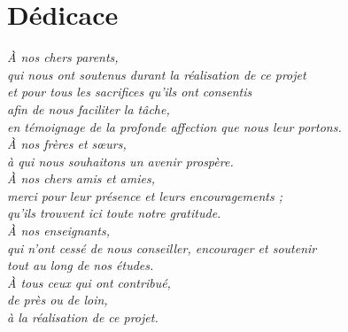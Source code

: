 
\chapter*{Dédicace}

\vspace*{2cm}

\begin{center}
{\large\itshape
À nos chers parents,\\
qui nous ont soutenus durant la réalisation de ce projet\\
et pour tous les sacrifices qu'ils ont consentis\\
afin de nous faciliter la tâche,\\
en témoignage de la profonde affection que nous leur portons.\\[1.2em]

À nos frères et sœurs,\\
à qui nous souhaitons un avenir prospère.\\[1.2em]

À nos chers amis et amies,\\
merci pour leur présence et leurs encouragements ;\\
qu'ils trouvent ici toute notre gratitude.\\[1.2em]

À nos enseignants,\\
qui n'ont cessé de nous conseiller, encourager et soutenir\\
tout au long de nos études.\\[1.2em]

À tous ceux qui ont contribué,\\
de près ou de loin,\\
à la réalisation de ce projet.
}

\vspace*{0.5cm}

\begin{figure}[H]
\centering
{}
\end{figure}

\end{center}

